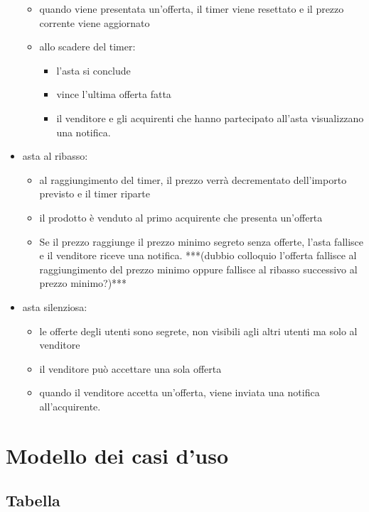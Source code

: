 \begin{itemize}
\begin{itemize}[label={\tiny$\blacksquare$}]
		      \item quando viene presentata un'offerta, il timer viene resettato e il prezzo corrente viene aggiornato
		      \item allo scadere del timer:
		            \begin{itemize}[label={\tiny$-$}]
			            \item l'asta si conclude
			            \item vince l'ultima offerta fatta
			            \item il venditore e gli acquirenti che hanno partecipato all'asta visualizzano una notifica.
		            \end{itemize}
	      \end{itemize}
	\item asta al ribasso:
	      \begin{itemize}[label={\tiny$\blacksquare$}]
		      \item al raggiungimento del timer, il prezzo verrà decrementato dell'importo previsto e il timer riparte
		      \item il prodotto è venduto al primo acquirente che presenta un'offerta
		      \item Se il prezzo raggiunge il prezzo minimo segreto senza offerte, l'asta fallisce e il venditore riceve una notifica. ***(dubbio colloquio l'offerta fallisce al raggiungimento del prezzo minimo oppure fallisce al ribasso successivo al prezzo minimo?)***
	      \end{itemize}
	\item asta silenziosa:
	      \begin{itemize}[label={\tiny$\blacksquare$}]
		      \item le offerte degli utenti sono segrete, non visibili agli altri utenti ma solo al venditore
		      \item il venditore può accettare una sola offerta
		      \item quando il venditore accetta un'offerta, viene inviata una notifica all'acquirente.
	      \end{itemize}

\end{itemize}

\newpage
\section{Modello dei casi d'uso}
\subsection{Tabella}

